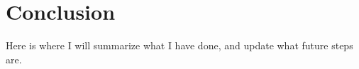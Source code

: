\chapter{Conclusion} \label{ch:conclusion}

\par Here is where I will summarize what I have done, and update what future steps are.